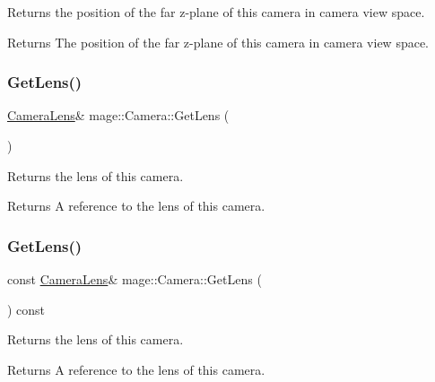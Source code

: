 Returns the position of the far z-\/plane of this camera in camera view space.

\begin{DoxyReturn}{Returns}
The position of the far z-\/plane of this camera in camera view space. 
\end{DoxyReturn}
\hypertarget{classmage_1_1_camera_ac9c78f262c8cea00c8887afe39625249}{}\label{classmage_1_1_camera_ac9c78f262c8cea00c8887afe39625249} 
\subsubsection{\texorpdfstring{Get\+Lens()}{GetLens()}\hspace{0.1cm}{\footnotesize\ttfamily [1/2]}}
{\footnotesize\ttfamily \hyperlink{classmage_1_1_camera_lens}{Camera\+Lens}\& mage\+::\+Camera\+::\+Get\+Lens (\begin{DoxyParamCaption}{ }\end{DoxyParamCaption})\hspace{0.3cm}{\ttfamily [noexcept]}}

Returns the lens of this camera.

\begin{DoxyReturn}{Returns}
A reference to the lens of this camera. 
\end{DoxyReturn}
\hypertarget{classmage_1_1_camera_ac2529ae81deabfbfed8f96cbf5b778eb}{}\label{classmage_1_1_camera_ac2529ae81deabfbfed8f96cbf5b778eb} 
\subsubsection{\texorpdfstring{Get\+Lens()}{GetLens()}\hspace{0.1cm}{\footnotesize\ttfamily [2/2]}}
{\footnotesize\ttfamily const \hyperlink{classmage_1_1_camera_lens}{Camera\+Lens}\& mage\+::\+Camera\+::\+Get\+Lens (\begin{DoxyParamCaption}{ }\end{DoxyParamCaption}) const\hspace{0.3cm}{\ttfamily [noexcept]}}

Returns the lens of this camera.

\begin{DoxyReturn}{Returns}
A reference to the lens of this camera. 
\end{DoxyReturn}
\hypertarget{classmage_1_1_camera_add4054d66911dd183cdec85eda77b4a1}{}\label{classmage_1_1_camera_add4054d66911dd183cdec85eda77b4a1} 
